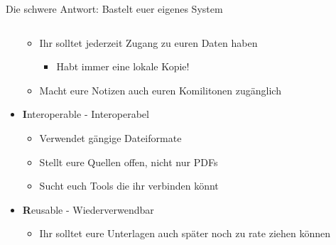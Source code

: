 \documentclass[aspectratio=169,shownotes]{beamer}
\begin{document}
\begin{frame}{Die schwere Antwort: Bastelt euer eigenes System}
\begin{columns}[t]
\begin{column}[t]{0.69\textwidth}
\begin{itemize}
                \begin{itemize}
                    \item Ihr solltet jederzeit Zugang zu euren Daten haben
                    \begin{itemize}
                        \item Habt immer eine lokale Kopie!
                    \end{itemize}
                \item Macht eure Notizen auch euren Komilitonen zugänglich
            \end{itemize}
                \item[] \textbf{I}nteroperable - Interoperabel
                \begin{itemize}
                    \item Verwendet gängige Dateiformate
                    \item Stellt eure Quellen offen, nicht nur PDFs
                    \item Sucht euch Tools die ihr verbinden könnt
                \end{itemize}
                \item[] \textbf{R}eusable - Wiederverwendbar
                \begin{itemize}
                    \item Ihr solltet eure Unterlagen auch später noch zu rate ziehen können
                \end{itemize}
            \end{itemize}
        \end{column}
    \end{columns}  
\end{frame}
\end{document}
